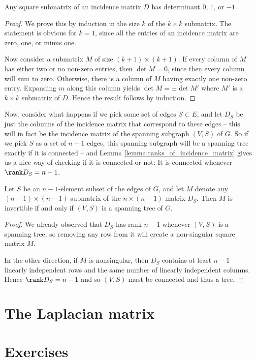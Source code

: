 \documentclass[nobib]{tufte-handout}
\begin{document}
\begin{lemma}
    Any square submatrix of an incidence matrix $D$ has determinant $0$, $1$, or $-1$.

    \begin{proof}
        We prove this by induction in the size $k$ of the $k\times k$ submatrix. The statement is obvious for $k=1$, since all the entries of an incidence matrix are zero, one, or minus one.

        Now consider a submatrix $M$ of size $(k+1)\times(k+1)$. If every column of $M$ has either two or no non-zero entries, then $\det M = 0$, since then every column will sum to zero. Otherwise, there is a column of $M$ having exactly one non-zero entry. Expanding $m$ along this column yields $\det M = \pm \det M'$ where $M'$ is a $k \times k$ submatrix of $D$. Hence the result follows by induction.
    \end{proof}
\end{lemma}

Now, consider what happens if we pick some set of edges $S \subset E$, and let $D_S$ be just the columns of the incidence matrix that correspond to these edges -- this will in fact be the incidence matrix of the spanning subgraph $(V, S)$ of $G$. So if we pick $S$ as a set of $n-1$ edges, this spanning subgraph will be a spanning tree exactly if it is connected -- and Lemma \ref{lemma:ranks_of_incidence_matrix} gives us a nice way of checking if it is connected or not: It is connected whenever $\rank D_S = n - 1$.

\begin{lemma}
    Let $S$ be an $n-1$-element subset of the edges of $G$, and let $M$ denote any $(n-1)\times (n-1)$ submatrix of the $n \times (n-1)$ matrix $D_S$. Then $M$ is invertible if and only if $(V,S)$ is a spanning tree of $G$.

    \begin{proof}
        We already observed that $D_S$ has rank $n-1$ whenever $(V,S)$ is a spanning tree, so removing any row from it will create a non-singular square matrix $M$.

        In the other direction, if $M$ is nonsingular, then $D_S$ contains at least $n-1$ linearly independent rows and the same number of linearly independent columns. Hence $\rank D_S = n - 1$ and so $(V,S)$ must be connected and thus a tree.
    \end{proof}
\end{lemma}

\section{The Laplacian matrix}
\section{Exercises}

%
%
\end{document}
